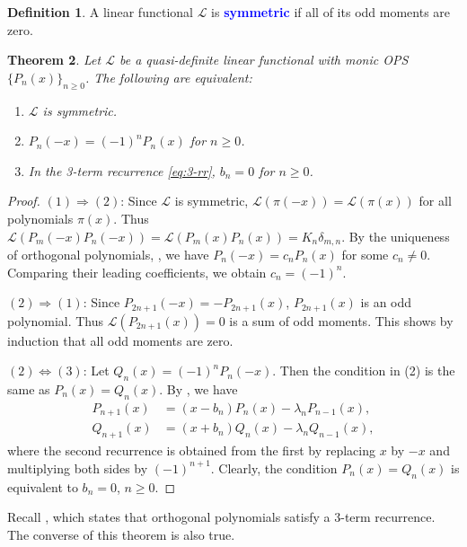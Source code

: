 \documentclass{amsart}
\numberwithin{equation}{section}
\newtheorem{thm}{Theorem}[section]
\theoremstyle{definition}
\newtheorem{defn}[thm]{Definition}
\newcommand\LL{\mathcal{L}}
\renewcommand\emph[1]{\textcolor{blue}{\bf #1}}
\begin{document}
\begin{defn}
  A linear functional \( \LL \) is \emph{symmetric} if all of its odd
  moments are zero.
\end{defn}

\begin{thm}
  Let \( \LL \) be a quasi-definite linear functional with monic OPS
  \( \{ P_n(x) \}_{n\ge 0} \). The following are equivalent:
  \begin{enumerate}
  \item \( \LL \) is symmetric.
  \item \( P_n(-x) = (-1)^n P_n(x) \) for \( n\ge0 \).
  \item In the 3-term recurrence \eqref{eq:3-rr}, \( b_n=0 \) for \( n\ge0 \).
  \end{enumerate}
\end{thm}

\begin{proof}
  \( (1) \Rightarrow (2) \): Since \( \LL \) is symmetric,
  \( \LL(\pi(-x)) = \LL(\pi(x)) \) for all polynomials \( \pi(x) \).
  Thus
  \( \LL(P_m(-x)P_n(-x)) = \LL(P_m(x)P_n(x)) = K_n \delta_{m,n} \).
By the uniqueness of orthogonal polynomials, ,
we have \( P_n(-x) = c_n P_n(x) \) for some \( c_n\ne 0 \).
Comparing their leading coefficients, we obtain \( c_n = (-1)^n \).

\( (2) \Rightarrow (1) \): Since \( P_{2n+1}(-x) = -P_{2n+1}(x) \),
\( P_{2n+1}(x) \) is an odd polynomial. Thus \( \LL(P_{2n+1}(x))=0 \)
is a sum of odd moments. This shows by induction that all odd moments
are zero.

\( (2) \Leftrightarrow (3) \): Let \( Q_n(x) = (-1)^n P_n(-x) \). Then
the condition in (2) is the same as \( P_n(x) = Q_n(x) \). By
, we have
\begin{align*}
    P_{n+1}(x) &= (x-b_n) P_n(x) - \lambda_n P_{n-1}(x),\\
    Q_{n+1}(x) &= (x+b_n) Q_n(x) - \lambda_n Q_{n-1}(x),
\end{align*}
where the second recurrence is obtained from the first by replacing
\( x \) by \( -x \) and multiplying both sides by \( (-1)^{n+1} \).
Clearly, the condition \( P_n(x) = Q_n(x) \)
is equivalent to \( b_n = 0 \), \( n\ge0 \).
\end{proof}


Recall , which states that orthogonal polynomials
satisfy a 3-term recurrence. The converse of this theorem is also
true.
\end{document}
